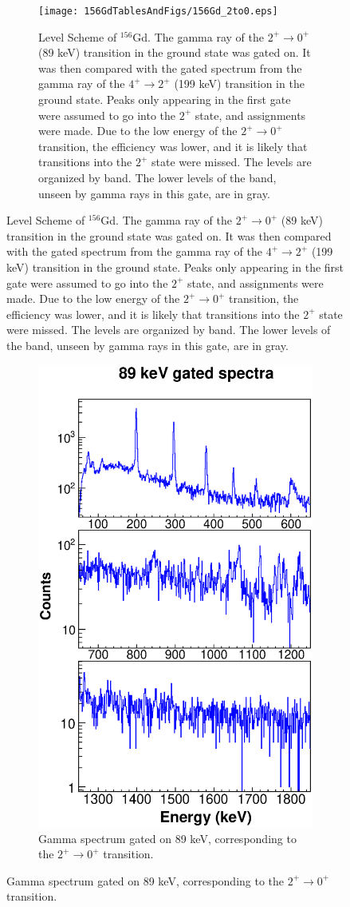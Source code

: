 \begin{figure}[!]
    \centering
    \begin{subfigure}{\textwidth}
    \texttt{[image: 156GdTablesAndFigs/156Gd\_2to0.eps]}
    \caption{\label{fig:156_2to0level}Level Scheme of $^{156}$Gd. The gamma ray of the $2^+\rightarrow0^+$ (89 keV) transition in the ground state was gated on. It was then compared with the gated spectrum from the gamma ray of the $4^+\rightarrow2^+$ (199 keV) transition in the ground state. Peaks only appearing in the first gate were assumed to go into the $2^+$ state, and assignments were made. Due to the low energy of the $2^+\rightarrow0^+$ transition, the efficiency was lower, and it is likely that transitions into the $2^+$ state were missed. The levels are organized by band. The lower levels of the band, unseen by gamma rays in this gate, are in gray.}
    \end{subfigure}
    \label{fig:156_2to0}
    \end{figure}
    \begin{figure}
    \ContinuedFloat
    \begin{subfigure}{\textwidth}
    \includegraphics[scale=0.8]{156GdTablesAndFigs/89_gamma.eps}
    \caption{Gamma spectrum gated on 89 keV, corresponding to the $2^+\rightarrow0^+$ transition.}
    \label{fig:156_2to0spec}
    \end{subfigure}
\end{figure}